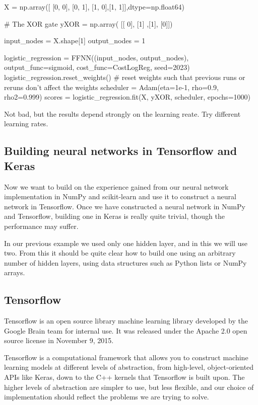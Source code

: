 \documentclass[%
oneside,                 %
final,                   %
10pt]{article}
\begin{document}
\bpycod
X = np.array([ [0, 0], [0, 1], [1, 0],[1, 1]],dtype=np.float64)

# The XOR gate
yXOR = np.array( [[ 0], [1] ,[1], [0]])

input_nodes = X.shape[1]
output_nodes = 1

logistic_regression = FFNN((input_nodes, output_nodes), output_func=sigmoid, cost_func=CostLogReg, seed=2023)
logistic_regression.reset_weights() # reset weights such that previous runs or reruns don't affect the weights
scheduler = Adam(eta=1e-1, rho=0.9, rho2=0.999)
scores = logistic_regression.fit(X, yXOR, scheduler, epochs=1000)

\epycod

Not bad, but the results depend strongly on the learning reate. Try different learning rates.

\subsection{Building neural networks in Tensorflow and Keras}

Now we want  to build on the experience gained from our neural network implementation in NumPy and scikit-learn
and use it to construct a neural network in Tensorflow. Once we have constructed a neural network in NumPy
and Tensorflow, building one in Keras is really quite trivial, though the performance may suffer.  

In our previous example we used only one hidden layer, and in this we will use two. From this it should be quite
clear how to build one using an arbitrary number of hidden layers, using data structures such as Python lists or
NumPy arrays.

\subsection{Tensorflow}

Tensorflow is an open source library machine learning library
developed by the Google Brain team for internal use. It was released
under the Apache 2.0 open source license in November 9, 2015.

Tensorflow is a computational framework that allows you to construct
machine learning models at different levels of abstraction, from
high-level, object-oriented APIs like Keras, down to the C++ kernels
that Tensorflow is built upon. The higher levels of abstraction are
simpler to use, but less flexible, and our choice of implementation
should reflect the problems we are trying to solve.
\end{document}
